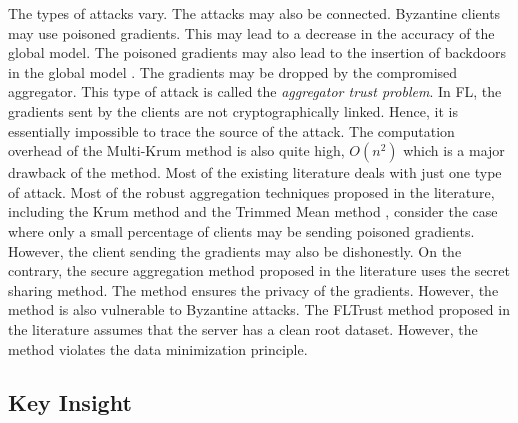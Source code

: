 \documentclass[10pt,twocolumn,letterpaper]{article}
\begin{document}
The types of attacks vary. The attacks may also be connected. Byzantine clients may use poisoned gradients. This may lead to a decrease in the accuracy of the global model. The poisoned gradients may also lead to the insertion of backdoors in the global model \cite{blanchard2017machine,fang2020local}. The gradients may be dropped by the compromised aggregator. This type of attack is called the \emph{aggregator trust problem}. In FL, the gradients sent by the clients are not cryptographically linked. Hence, it is essentially impossible to trace the source of the attack. The computation overhead of the Multi-Krum method is also quite high, $O(n^2)$ which is a major drawback of the method. Most of the existing literature deals with just one type of attack. Most of the robust aggregation techniques proposed in the literature, including the Krum method \cite{blanchard2017machine} and the Trimmed Mean method \cite{yin2018byzantine}, consider the case where only a small percentage of clients may be sending poisoned gradients. However, the client sending the gradients may also be dishonestly. On the contrary, the secure aggregation method proposed in the literature \cite{bonawitz2017practical} uses the secret sharing method. The method ensures the privacy of the gradients. However, the method is also vulnerable to Byzantine attacks. The FLTrust method proposed in the literature \cite{cao2021fltrust} assumes that the server has a clean root dataset. However, the method violates the data minimization principle.

\subsection{Key Insight}

\end{document}
